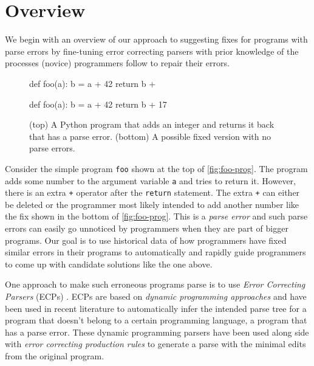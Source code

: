 \section{Overview}
\label{sec:overview}

We begin with an overview of our approach to suggesting fixes for programs with
parse errors by fine-tuning error correcting parsers with prior knowledge of the
processes (novice) programmers follow to repair their errors.

\begin{figure}[ht]
\begin{ecode}
def foo(a):
  b = a + 42
  return b +
\end{ecode}

\begin{ecode}
def foo(a):
  b = a + 42
  return b + 17
\end{ecode}
\caption{(top) A Python program that adds an integer and returns it back that
has a parse error. (bottom) A possible fixed version with no parse errors.}
\label{fig:foo-prog}
\end{figure}


 Consider the simple program \texttt{foo} shown at the top
of \autoref{fig:foo-prog}. The program adds some number to the argument variable
\texttt{a} and tries to return it. However, there is an extra \texttt{+}
operator after the \texttt{return} statement. The extra \texttt{+} can either be
deleted or the programmer most likely intended to add another number like the
fix shown in the bottom of \autoref{fig:foo-prog}. This is a \emph{parse error}
and such parse errors can easily go unnoticed \citep{?} by programmers when they
are part of bigger programs.
%
Our goal is to use historical data of how programmers have fixed similar errors
in their programs to automatically and rapidly guide programmers to come up with
candidate solutions like the one above.


One approach to make such erroneous programs parse is to use \emph{Error
Correcting Parsers} (ECPs) \citep{?}. ECPs are based on \emph{dynamic
programming approaches} and have been used in recent literature to automatically
infer the intended parse tree for a program that doesn't belong to a certain
programming language, \ie a program that has a parse error. These dynamic
programming parsers have been used along side with \emph{error correcting
production rules} \citep{?} to generate a parse with the minimal edits from the
original program.

